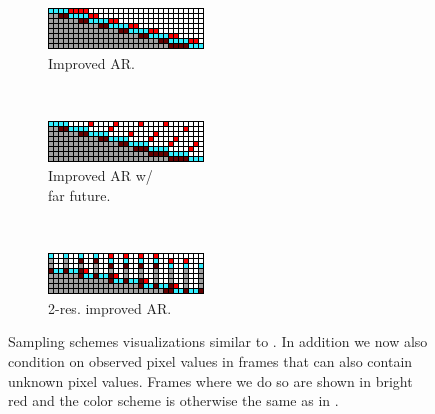 \begin{figure}[t!]
    \centering
    \begin{subfigure}[t]{0.3\textwidth}
        \centering
        \includegraphics[width=\textwidth]{figures/sampling-scheme-visualizations/autoregressive-with-near-future.png}
        \caption{Improved AR.}
        \label{fig:improved-ar}
    \end{subfigure}
    ~
    \begin{subfigure}[t]{0.3\textwidth}
        \centering
        \includegraphics[width=\textwidth]{figures/sampling-scheme-visualizations/autoregressive-with-future.png}
        \caption{Improved AR w/ \\ far future.}
        \label{fig:improved-ar-w-far-future}
    \end{subfigure}
    ~
    \begin{subfigure}[t]{0.3\textwidth}
        \centering
        \includegraphics[width=\textwidth]{figures/sampling-scheme-visualizations/autoregressive-multires-3-1.png}
        \caption{2-res. improved AR.}
        \label{fig:multiscale}
    \end{subfigure}%
    \caption[A visualization of sampling schemes for video inpainting.]{Sampling schemes visualizations similar to . In addition we now also condition on observed pixel values in frames that can also contain unknown pixel values. Frames where we do so are shown in \textcolor{observedfuturecolor}{bright red} and the color scheme is otherwise the same as in .
    }
    \label{fig:sampling-schemes}
\end{figure}

